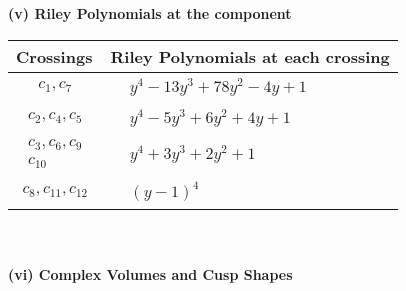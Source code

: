 \documentclass[1p]{elsarticle_modified}
\theoremstyle{definition}
\begin{document}
\newpage\renewcommand{\arraystretch}{1}
\flushleft \textbf{(v) Riley Polynomials at the component}\newline \\
\begin{tabular}{m{50pt}|m{274pt}}
Crossings & \hspace{64pt}Riley Polynomials at each crossing \\
\hline $$\begin{aligned}c_{1},c_{7}\end{aligned}$$&$\begin{aligned}
&y^4-13 y^3+78 y^2-4 y+1
\end{aligned}$\\
\hline $$\begin{aligned}c_{2},c_{4},c_{5}\end{aligned}$$&$\begin{aligned}
&y^4-5 y^3+6 y^2+4 y+1
\end{aligned}$\\
\hline $$\begin{aligned}c_{3},c_{6},c_{9}\\c_{10}\end{aligned}$$&$\begin{aligned}
&y^4+3 y^3+2 y^2+1
\end{aligned}$\\
\hline $$\begin{aligned}c_{8},c_{11},c_{12}\end{aligned}$$&$\begin{aligned}
&(y-1)^4
\end{aligned}$\\
\hline
\end{tabular}\\~\\
\newpage\flushleft \textbf{(vi) Complex Volumes and Cusp Shapes}
\end{document}
